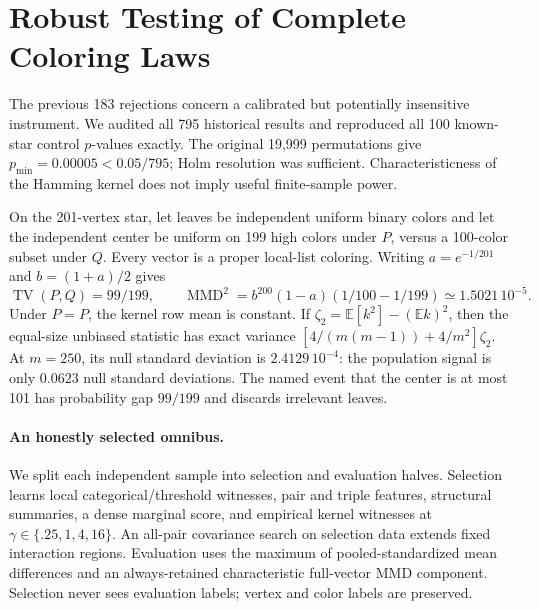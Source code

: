 \section{Robust Testing of Complete Coloring Laws}
\label{sec:robust-laws}
The previous 183 rejections concern a calibrated but potentially insensitive
instrument. We audited all 795 historical results and reproduced all 100
known-star control $p$-values exactly. The original 19,999 permutations give
$p_{\min}=0.00005<0.05/795$; Holm resolution was sufficient. Characteristicness
of the Hamming kernel does not imply useful finite-sample power.

On the 201-vertex star, let leaves be independent uniform binary colors and
let the independent center be uniform on 199 high colors under $P$, versus
a 100-color subset under $Q$. Every vector is a proper local-list coloring.
Writing $a=e^{-1/201}$ and $b=(1+a)/2$ gives
\[
 \operatorname{TV}(P,Q)=99/199,\qquad
 \operatorname{MMD}^2=b^{200}(1-a)(1/100-1/199)
 \simeq1.5021\,10^{-5}.
\]
Under $P=P$, the kernel row mean is constant. If
$\zeta_2=\mathbb E[k^2]-(\mathbb E k)^2$, then the equal-size unbiased
statistic has exact variance
$[4/(m(m-1))+4/m^2]\zeta_2$. At $m=250$, its null standard deviation is
$2.4129\,10^{-4}$: the population signal is only $0.0623$ null standard
deviations. The named event that the center is at most 101 has probability
gap $99/199$ and discards irrelevant leaves.

\paragraph{An honestly selected omnibus.}
We split each independent sample into selection and evaluation halves.
Selection learns local categorical/threshold witnesses, pair and triple
features, structural summaries, a dense marginal score, and empirical
kernel witnesses at $\gamma\in\{.25,1,4,16\}$. An all-pair covariance search
on selection data extends fixed interaction regions. Evaluation uses the
maximum of pooled-standardized mean differences and an always-retained
characteristic full-vector MMD component. Selection never sees evaluation
labels; vertex and color labels are preserved.

